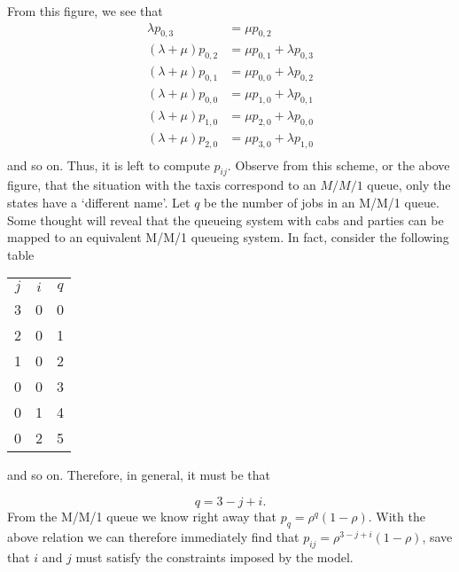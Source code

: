 \documentclass[companion]{subfiles}
\begin{document}
\begin{exercise}[Hall 5.22]
\begin{solution}
\begin{center}
 
 \end{center}

From this figure, we see that
\begin{align*}
\lambda p_{0,3} &= \mu p_{0,2} \\
(\lambda+\mu) p_{0,2} &= \mu p_{0,1} + \lambda p_{0,3}\\
(\lambda+\mu) p_{0,1} &= \mu p_{0,0} + \lambda p_{0,2}\\
(\lambda+\mu) p_{0,0} &= \mu p_{1,0} + \lambda p_{0,1}\\
(\lambda+\mu) p_{1,0} &= \mu p_{2,0} + \lambda p_{0,0}\\
(\lambda+\mu) p_{2,0} &= \mu p_{3,0} + \lambda p_{1,0}\\
\end{align*}
and so on. Thus, it is left to compute $p_{ij}$. Observe from this
scheme, or the above figure, that the situation with the taxis
correspond to an $M/M/1$ queue, only the states have a `different
name'. Let $q$ be the number of jobs in an M/M/1 queue. Some thought
will reveal that the queueing system with cabs and parties can be
mapped to an equivalent M/M/1 queueing system. In fact, consider the
following table
\begin{center}
\begin{tabular}{ccc}
$j$ & $i$ & $q$\\
3& 0 & 0\\
2 & 0& 1\\
1 & 0& 2\\
0& 0& 3\\
0& 1& 4\\
0& 2& 5\\
\end{tabular}
\end{center}
and so on. Therefore, in general, it must be that 

\begin{equation*}
q = 3 - j +i.
\end{equation*}
From the M/M/1 queue we know right away that $p_q = \rho^q
(1-\rho)$. With the above relation we can therefore immediately find
that $p_{ij} = \rho^{3-j+i}(1-\rho)$, save that $i$ and
$j$ must satisfy the constraints imposed by the model.


\end{solution}
\end{exercise}
\end{document}
